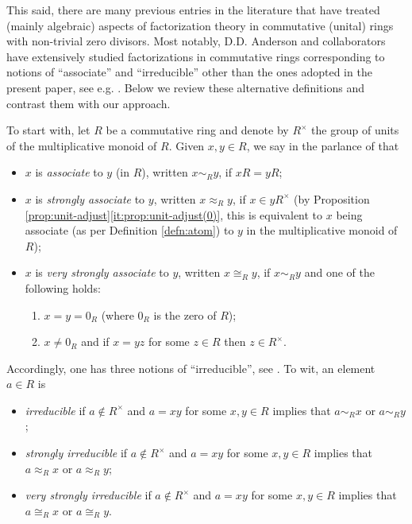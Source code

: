 This said, there are many previous entries in the literature that have treated (mainly algebraic) aspects of factorization theory in commutative (unital) rings with non-trivial zero divisors. Most notably, D.D. Anderson and collaborators have extensively studied factorizations in commutative rings corresponding to notions of ``associate'' and ``irreducible'' other than the ones adopted in the present paper, see e.g. \cite{AndMar85a,AndMar85b,AnVL96,AnVL97,AgAnVL01,chun-anderson11,chun-anderson-vl11}. Below we review these alternative definitions and contrast them with our approach. 

To start with, let $R$ be a commutative ring and denote by $R^\times$ the group of units of the multiplicative monoid of $R$. Given $x, y \in R$, we say in the parlance of \cite[Definition 2.1]{AnVL96} that 
\begin{itemize}
	\item $x$ is \emph{associate} to $y$ (in $R$), written $x \sim_R y$, if $xR = yR$;
	\item $x$ is \emph{strongly associate} to $y$, written $x \approx_R y$, if $x \in yR^\times$ (by Proposition \ref{prop:unit-adjust}\ref{it:prop:unit-adjust(0)}, this is equivalent to $x$ being associate (as per Definition \ref{defn:atom}) to $y$ in the multiplicative monoid of $R$);
	\item $x$ is \emph{very strongly associate} to $y$, written $x \cong_R y$, if $x \sim_R y$ and one of the following holds:
	\begin{enumerate}[label = {\rm (\roman{*})}] 
		\item $x = y = 0_R$ (where $0_R$ is the zero of $R$);
		\item $x \neq 0_R$ and if $x = yz$ for some $z \in R$ then $z \in R^\times$.
	\end{enumerate}
\end{itemize}
%
Accordingly, one has three notions of ``irreducible'', see \cite[Definition 2.4]{AnVL96}. To wit, an element $a \in R$ is 
\begin{itemize}
	\item \emph{irreducible} if $a \notin R^\times$ and $a=xy$ for some $x, y \in R$ implies that $a \sim_R x$ or $a \sim_R y$;
	\item \emph{strongly irreducible} if $a \notin R^\times$ and $a=xy$ for some $x, y \in R$ implies that $a \approx_R x$ or $a \approx_R y$;
	\item \emph{very strongly irreducible} if $a \notin R^\times$ and $a=xy$ for some $x, y \in R$ implies that $a \cong_R x$ or $a \cong_R y$.
\end{itemize}
